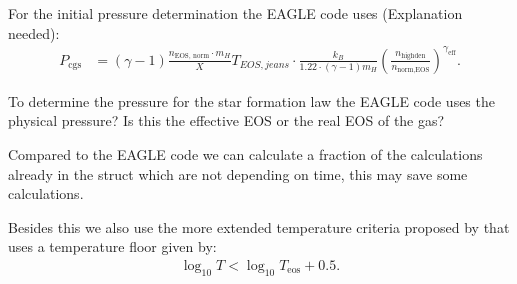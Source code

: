 For the initial pressure determination the EAGLE code uses (Explanation needed):
\begin{align}
 P_\text{cgs} &= (\gamma -1) \frac{n_\text{EOS, norm} \cdot m_H}{X} T_{EOS,jeans} \cdot \frac{k_B}{1.22 \cdot (\gamma -1) m_H } \left( \frac{n_\text{highden}}{n_\text{norm,EOS}} \right)^{\gamma_\text{eff}}.
\end{align}

To determine the pressure for the star formation law the EAGLE code uses the 
physical pressure? Is this the effective EOS or the real EOS of the gas?

Compared to the EAGLE code we can calculate a fraction of the calculations already 
in the struct which are not depending on time, this may save some calculations. 

Besides this we also use the more extended temperature criteria proposed by
\citet{dallavecchia2012} that uses a temperature floor given by:
\begin{align}
 \log_{10} T < \log_{10} T_\text{eos} + 0.5.
\end{align}





